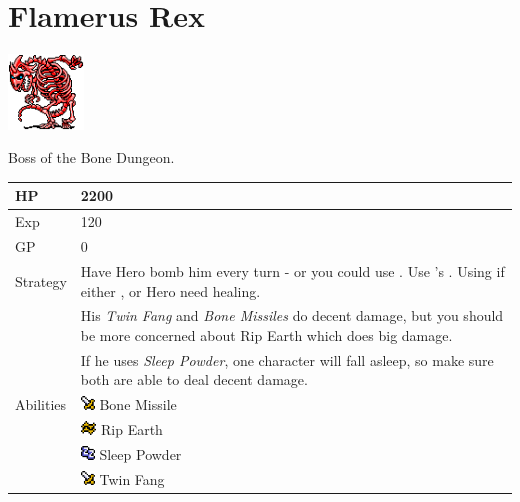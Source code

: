 \section{Flamerus Rex}
\label{monster:flamerus_rex}

\includegraphics[height=2cm,keepaspectratio]{./resources/monster/flamerus_rex}

Boss of the Bone Dungeon.

\begin{longtable}{ l p{9cm} }
	HP
	& 2200
\\ \hline
	Exp
	& 120
\\ \hline
	GP
	& 0
\\ \hline
	Strategy
	& Have Hero bomb him every turn - or you could use \nameref{spell:quake}. Use \nameref{char:tristam}'s \nameref{weapon:ninja_stars}. Using \nameref{spell:life} if either \nameref{char:tristam}, or Hero need healing. \\
	& His \textit{Twin Fang} and \textit{Bone Missiles} do decent damage, but you should be more concerned about Rip Earth which does big damage. \\
	& If he uses \textit{Sleep Powder}, one character will fall asleep, so make sure both are able to deal decent damage.
\\ \hline
	Abilities
	& \includegraphics[height=1em,keepaspectratio]{./resources/effects/damage} Bone Missile \\
	& \includegraphics[height=1em,keepaspectratio]{./resources/effects/earth} Rip Earth \\
	& \includegraphics[height=1em,keepaspectratio]{./resources/effects/sleep} Sleep Powder \\
	& \includegraphics[height=1em,keepaspectratio]{./resources/effects/damage} Twin Fang \\
\end{longtable}

